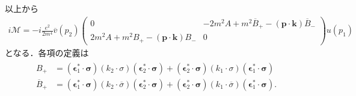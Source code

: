 以上から
\begin{align}
  i\mathcal{M}= -i\frac{e^2}{2m^4} \overline{v}(p_2)
  \begin{pmatrix}
    0 & -2m^2A + m^2\overline{B}_+ - (\boldsymbol{p}\cdot\boldsymbol{k}) \overline{B}_- \\
    2m^2A + m^2B_+ - (\boldsymbol{p}\cdot\boldsymbol{k}) B_- & 0
  \end{pmatrix}
  u(p_1) \label{prob5_4a_iM_AB}
\end{align}
となる．各項の定義は
\begin{align}
  \begin{split}
    B_+ &= (\boldsymbol{\epsilon}_1^\ast \cdot \boldsymbol\sigma)(k_2 \cdot \sigma)(\boldsymbol{\epsilon}_2^\ast \cdot \boldsymbol\sigma)
    + (\boldsymbol{\epsilon}_2^\ast \cdot \boldsymbol\sigma)(k_1 \cdot \sigma)(\boldsymbol{\epsilon}_1^\ast \cdot \boldsymbol\sigma) \\
    \overline{B}_+ &= (\boldsymbol{\epsilon}_1^\ast \cdot \boldsymbol\sigma)(k_2 \cdot \overline\sigma)(\boldsymbol{\epsilon}_2^\ast \cdot \boldsymbol\sigma)
    + (\boldsymbol{\epsilon}_2^\ast \cdot \boldsymbol\sigma)(k_1 \cdot \overline\sigma)(\boldsymbol{\epsilon}_1^\ast \cdot \boldsymbol\sigma)
    .
  \end{split}
  \label{prob5_4a_AB_def}
\end{align}


